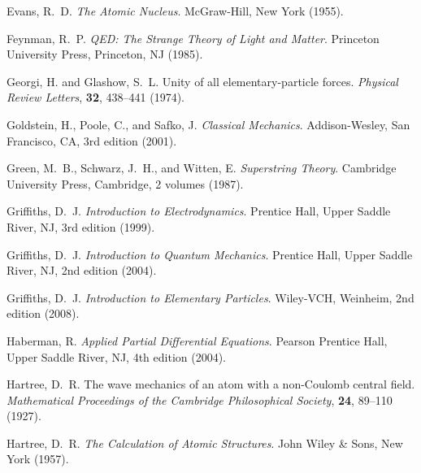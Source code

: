 \documentclass[12pt,a4paper]{article}
\begin{document}
\begin{thebibliography}{99}
		Evans, R.~D.
		\newblock \textit{The Atomic Nucleus}.
		\newblock McGraw-Hill, New York (1955).
		
		Feynman, R.~P.
		\newblock \textit{QED: The Strange Theory of Light and Matter}.
		\newblock Princeton University Press, Princeton, NJ (1985).
		
		Georgi, H. and Glashow, S.~L.
		\newblock Unity of all elementary-particle forces.
		\newblock \textit{Physical Review Letters}, \textbf{32}, 438--441 (1974).
		\newblock {}
		
		Goldstein, H., Poole, C., and Safko, J.
		\newblock \textit{Classical Mechanics}.
		\newblock Addison-Wesley, San Francisco, CA, 3rd edition (2001).
		
		Green, M.~B., Schwarz, J.~H., and Witten, E.
		\newblock \textit{Superstring Theory}.
		\newblock Cambridge University Press, Cambridge, 2 volumes (1987).
		
		Griffiths, D.~J.
		\newblock \textit{Introduction to Electrodynamics}.
		\newblock Prentice Hall, Upper Saddle River, NJ, 3rd edition (1999).
		
		Griffiths, D.~J.
		\newblock \textit{Introduction to Quantum Mechanics}.
		\newblock Prentice Hall, Upper Saddle River, NJ, 2nd edition (2004).
		
		Griffiths, D.~J.
		\newblock \textit{Introduction to Elementary Particles}.
		\newblock Wiley-VCH, Weinheim, 2nd edition (2008).
		
		Haberman, R.
		\newblock \textit{Applied Partial Differential Equations}.
		\newblock Pearson Prentice Hall, Upper Saddle River, NJ, 4th edition (2004).
		
		Hartree, D.~R.
		\newblock The wave mechanics of an atom with a non-Coulomb central field.
		\newblock \textit{Mathematical Proceedings of the Cambridge Philosophical Society}, \textbf{24}, 89--110 (1927).
		\newblock {}
		
		Hartree, D.~R.
		\newblock \textit{The Calculation of Atomic Structures}.
		\newblock John Wiley \& Sons, New York (1957).
		

\end{thebibliography}
\end{document}
